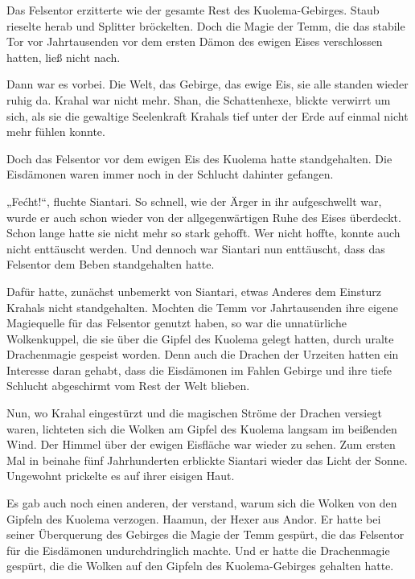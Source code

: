 Das Felsentor erzitterte wie der gesamte Rest des Kuolema-Gebirges. Staub rieselte herab und Splitter bröckelten. Doch die Magie der Temm, die das stabile Tor vor Jahrtausenden vor dem ersten Dämon des ewigen Eises verschlossen hatten, ließ nicht nach.

Dann war es vorbei. Die Welt, das Gebirge, das ewige Eis, sie alle standen wieder ruhig da. Krahal war nicht mehr. Shan, die Schattenhexe, blickte verwirrt um sich, als sie die gewaltige Seelenkraft Krahals tief unter der Erde auf einmal nicht mehr fühlen konnte.

Doch das Felsentor vor dem ewigen Eis des Kuolema hatte standgehalten. Die Eisdämonen waren immer noch in der Schlucht dahinter gefangen.

„Fećht!“, fluchte Siantari. So schnell, wie der Ärger in ihr aufgeschwellt war, wurde er auch schon wieder von der allgegenwärtigen Ruhe des Eises überdeckt. Schon lange hatte sie nicht mehr so stark gehofft. Wer nicht hoffte, konnte auch nicht enttäuscht werden. Und dennoch war Siantari nun enttäuscht, dass das Felsentor dem Beben standgehalten hatte.

Dafür hatte, zunächst unbemerkt von Siantari, etwas Anderes dem Einsturz Krahals nicht standgehalten. Mochten die Temm vor Jahrtausenden ihre eigene Magiequelle für das Felsentor genutzt haben, so war die unnatürliche Wolkenkuppel, die sie über die Gipfel des Kuolema gelegt hatten, durch uralte Drachenmagie gespeist worden. Denn auch die Drachen der Urzeiten hatten ein Interesse daran gehabt, dass die Eisdämonen im Fahlen Gebirge und ihre tiefe Schlucht abgeschirmt vom Rest der Welt blieben.

Nun, wo Krahal eingestürzt und die magischen Ströme der Drachen versiegt waren, lichteten sich die Wolken am Gipfel des Kuolema langsam im beißenden Wind. Der Himmel über der ewigen Eisfläche war wieder zu sehen. Zum ersten Mal in beinahe fünf Jahrhunderten erblickte Siantari wieder das Licht der Sonne. Ungewohnt prickelte es auf ihrer eisigen Haut.



\trennzeichen



Es gab auch noch einen anderen, der verstand, warum sich die Wolken von den Gipfeln des Kuolema verzogen. Haamun, der Hexer aus Andor. Er hatte bei seiner Überquerung des Gebirges die Magie der Temm gespürt, die das Felsentor für die Eisdämonen undurchdringlich machte. Und er hatte die Drachenmagie gespürt, die die Wolken auf den Gipfeln des Kuolema-Gebirges gehalten hatte.

